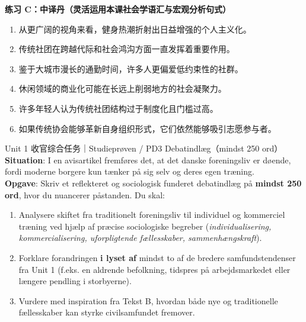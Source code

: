 \textbf{练习 C：中译丹（灵活运用本课社会学语汇与宏观分析句式）}
\begin{enumerate}
  \item 从更广阔的视角来看，健身热潮折射出日益增强的个人主义化。
  \item 传统社团在跨越代际和社会鸿沟方面一直发挥着重要作用。
  \item 鉴于大城市漫长的通勤时间，许多人更偏爱低约束性的社群。
  \item 休闲领域的商业化可能在长远上削弱地方的社会凝聚力。
  \item 许多年轻人认为传统社团结构过于制度化且门槛过高。
  \item 如果传统协会能够革新自身组织形式，它们依然能够吸引志愿参与者。
\end{enumerate}


\begin{emailbox}{Unit 1 收官综合任务｜Studieprøven / PD3 Debatindlæg（mindst 250 ord）}
\textbf{Situation}: I en avisartikel fremføres det, at det danske foreningsliv er døende, fordi moderne borgere kun tænker på sig selv og deres egen træning.\\
\textbf{Opgave}: Skriv et reflekteret og sociologisk funderet debatindlæg på \textbf{mindst 250 ord}, hvor du nuancerer påstanden. Du skal:
\begin{enumerate}
  \item Analysere skiftet fra traditionelt foreningsliv til individuel og kommerciel træning ved hjælp af præcise sociologiske begreber (\textit{individualisering, kommercialisering, uforpligtende fællesskaber, sammenhængskraft}).
  \item Forklare forandringen \textbf{i lyset af} mindst to af de bredere samfundstendenser fra Unit 1 (f.eks. en aldrende befolkning, tidspres på arbejdsmarkedet eller længere pendling i storbyerne).
  \item Vurdere med inspiration fra Tekst B, hvordan både nye og traditionelle fællesskaber kan styrke civilsamfundet fremover.
\end{enumerate}
\end{emailbox}

